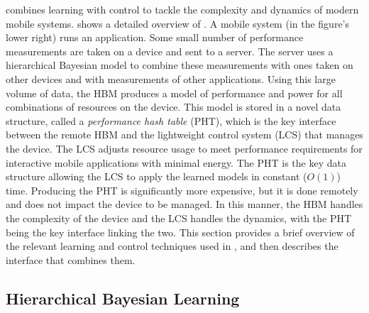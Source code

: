 \SYSTEM{} combines learning with control to tackle the complexity and
dynamics of modern mobile systems.   shows a detailed
overview of \SYSTEM{}.  A mobile system (in the figure's lower right)
runs an application.  Some small number of performance measurements
are taken on a device and sent to a server.  The server uses a
hierarchical Bayesian model to combine these measurements with ones
taken on other devices and with measurements of other applications.
Using this large volume of data, the HBM produces a model of
performance and power for all combinations of resources on the device.
This model is stored in a novel data structure, called a
\emph{performance hash table} (PHT), which is the key interface
between the remote HBM and the lightweight control system (LCS) that
manages the device.  The LCS adjusts resource usage to meet
performance requirements for interactive mobile applications with
minimal energy.  The PHT is the key data structure allowing the LCS to
apply the learned models in constant ($O(1)$) time.  Producing the PHT
is significantly more expensive, but it is done remotely and does not
impact the device to be managed.  In this manner, the HBM handles the
complexity of the device and the LCS handles the dynamics, with the
PHT being the key interface linking the two.  This section provides a
brief overview of the relevant learning and control techniques used in
\SYSTEM{}, and then describes the interface that combines them.

\subsection{Hierarchical Bayesian Learning}
\label{sec:framework:HBM}


